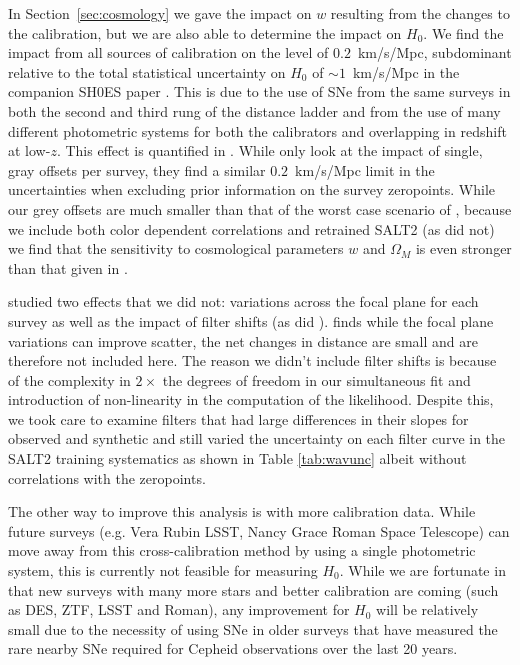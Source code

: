 \documentclass[twocolumn]{aastex63}
\newcommand{\blue}{\color{black}}
\newcommand{\red}{\color{black}}
\begin{document}
In Section~\ref{sec:cosmology} we gave the impact on $w$ resulting from the changes to the calibration, but we are also able to determine the impact on $H_0$.  We find the impact from all sources of calibration on the level of $0.2$~km/s/Mpc, subdominant relative to the total statistical uncertainty on $H_0$ of $\sim1$~km/s/Mpc in the companion SH0ES paper \citep{riess22}. This is due to the use of SNe from the same surveys in both the second and third rung of the distance ladder and from the use of many different photometric systems for both the calibrators and overlapping in redshift at low-$z$.  This effect is quantified in \cite{Brownsberger21}.  While \cite{Brownsberger21}  only look at the impact of single, gray offsets per survey, they find a similar $0.2$~km/s/Mpc limit in the uncertainties when excluding prior information on the survey zeropoints. While our grey offsets are much smaller than that of the worst case scenario of \cite{Brownsberger21}, because we include both color dependent correlations and retrained SALT2 (as \cite{Brownsberger21} did not) we find that the sensitivity to cosmological parameters $w$ and $\Omega_{M}$ is even stronger than that given in \cite{Brownsberger21}.
 
 \cite{Currie20} studied two effects that we did not: variations across the focal plane for each survey as well as the impact of filter shifts {\red (as did \citealt{Betoule2014})}. \cite{Currie20} finds while the focal plane variations can improve scatter, the net changes in distance are small and are therefore not included here.  The reason we didn't include filter shifts is because of the complexity in $2\times$ the degrees of freedom in our simultaneous fit {\blue and introduction of non-linearity in the computation of the likelihood.}  Despite this, we took care to examine filters that had large differences in their slopes for observed and synthetic {\red and still varied the uncertainty on each filter curve in the SALT2 training systematics as shown in Table \ref{tab:wavunc} albeit without correlations with the zeropoints.}

The other way to improve this analysis is with more calibration data.  While future surveys (e.g. Vera Rubin LSST, Nancy Grace Roman Space Telescope) can move away from this cross-calibration method by using a single photometric system, this is currently not feasible for measuring $H_0$.  
While we are fortunate in that new surveys with many more stars and better calibration are coming (such as DES, ZTF, LSST and Roman), any improvement for $H_0$ will be relatively small due to the necessity of using SNe in older surveys {\blue that have measured the rare nearby SNe required for Cepheid observations over the last 20 years. }
\end{document}
